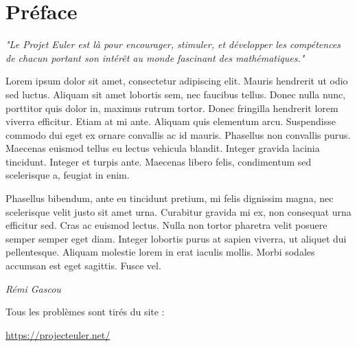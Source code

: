\section*{Préface} 

\begin{center}
    
    \LARGE{\textit{"Le Projet Euler est là pour encourager, stimuler, et développer les compétences de chacun portant son intérêt au monde fascinant des mathématiques."}}
    
\end{center}

Lorem ipsum dolor sit amet, consectetur adipiscing elit. Mauris hendrerit ut odio sed luctus. Aliquam sit amet lobortis sem, nec faucibus tellus. Donec nulla nunc, porttitor quis dolor in, maximus rutrum tortor. Donec fringilla hendrerit lorem viverra efficitur. Etiam at mi ante. Aliquam quis elementum arcu. Suspendisse commodo dui eget ex ornare convallis ac id mauris. Phasellus non convallis purus. Maecenas euismod tellus eu lectus vehicula blandit. Integer gravida lacinia tincidunt. Integer et turpis ante. Maecenas libero felis, condimentum sed scelerisque a, feugiat in enim.


Phasellus bibendum, ante eu tincidunt pretium, mi felis dignissim magna, nec scelerisque velit justo sit amet urna. Curabitur gravida mi ex, non consequat urna efficitur sed. Cras ac euismod lectus. Nulla non tortor pharetra velit posuere semper semper eget diam. Integer lobortis purus at sapien viverra, ut aliquet dui pellentesque. Aliquam molestie lorem in erat iaculis mollis. Morbi sodales accumsan est eget sagittis. Fusce vel.



\begin{flushright}
    \textit{{Rémi Gascou}}
\end{flushright}

\vspace{5cm}

\begin{center}
    Tous les problèmes sont tirés du site :
    
    \href{https://projecteuler.net/}{https://projecteuler.net/}
\end{center}
